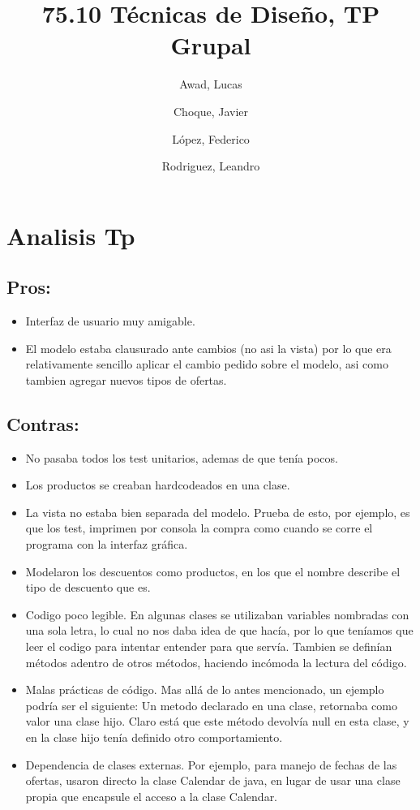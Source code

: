 \documentclass[a4paper,10pt, notitlepage]{article}
\title{\textbf{75.10 Técnicas de Diseño, TP Grupal}}
\author{Awad, Lucas \and Choque, Javier \and López, Federico \and Rodriguez, Leandro}
\date{}
\begin{document}
\maketitle

\thispagestyle{empty}

\newpage

\section{Analisis Tp}

\subsection{Pros:}
\begin{itemize}
\item Interfaz de usuario muy amigable. 
\item El modelo estaba clausurado ante cambios (no asi la vista) por lo que era relativamente sencillo aplicar el cambio pedido 
sobre el modelo, asi como tambien agregar nuevos tipos de ofertas.
\end{itemize}

\subsection{Contras:}
\begin{itemize}
\item No pasaba todos los test unitarios, ademas de que tenía pocos.
\item Los productos se creaban hardcodeados en una clase.
\item La vista no estaba bien separada del modelo. Prueba de esto, por ejemplo, es que los test, imprimen por consola la compra 
como cuando se corre el programa con la interfaz gráfica.
\item Modelaron los descuentos como productos, en los que el nombre describe el tipo de descuento que es.
\item Codigo poco legible. En algunas clases se utilizaban variables nombradas con una sola letra, lo cual no nos daba idea de que 
hacía, por lo que teníamos que leer el codigo para intentar entender para que servía. Tambien se definían métodos adentro de otros 
métodos, haciendo incómoda la lectura del código.
\item Malas prácticas de código. Mas allá de lo antes mencionado, un ejemplo podría ser el siguiente: Un metodo declarado en una 
clase, retornaba como valor una clase hijo. Claro está que este método devolvía null en esta clase, y en la clase hijo tenía 
definido otro comportamiento.
\item Dependencia de clases externas. Por ejemplo, para manejo de fechas de las ofertas, usaron directo la clase Calendar de java, 
en lugar de usar una clase propia que encapsule el acceso a la clase Calendar.
\end{itemize}
\end{document}
